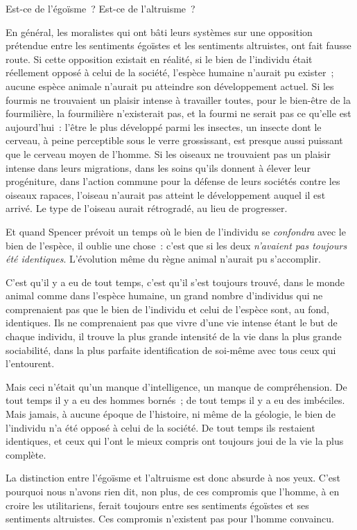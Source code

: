 \documentclass[french,twoside]{book} %
\begin{document}
Est-ce de l’égoïsme ? Est-ce de l’altruisme ?\par
\bigbreak
\noindent En général, les moralistes qui ont bâti leurs systèmes sur une opposition prétendue entre les sentiments égoïstes et les sentiments altruistes, ont fait fausse route. Si cette opposition existait en réalité, si le bien de l’individu était réellement opposé à celui de la société, l’espèce humaine n’aurait pu exister ; aucune espèce animale n’aurait pu atteindre son développement actuel. Si les fourmis ne trouvaient un plaisir intense à travailler toutes, pour le bien-être de la fourmilière, la fourmilière n’existerait pas, et la fourmi ne serait pas ce qu’elle est aujourd’hui : l’être le plus développé parmi les insectes, un insecte dont le cerveau, à peine perceptible sous le verre grossissant, est presque aussi puissant que le cerveau moyen de l’homme. Si les oiseaux ne trouvaient pas un plaisir intense dans leurs migrations, dans les soins qu’ils donnent à élever leur progéniture, dans l’action commune pour la défense de leurs sociétés contre les oiseaux rapaces, l’oiseau n’aurait pas atteint le développement auquel il est arrivé. Le type de l’oiseau aurait rétrogradé, au lieu de progresser.\par
Et quand Spencer prévoit un temps où le bien de l’individu se \emph{confondra} avec le bien de l’espèce, il oublie une chose : c’est que si les deux \emph{n’avaient pas toujours été identiques}. L’évolution même du règne animal n’aurait pu s’accomplir.\par
C’est qu’il y a eu de tout temps, c’est qu’il s’est toujours trouvé, dans le monde animal comme dans l’espèce humaine, un grand nombre d’individus qui ne comprenaient pas que le bien de l’individu et celui de l’espèce sont, au fond, identiques. Ils ne comprenaient pas que vivre d’une vie intense étant le but de chaque individu, il trouve la plus grande intensité  de la vie dans la plus grande sociabilité, dans la plus parfaite identification de soi-même avec tous ceux qui l’entourent.\par
Mais ceci n’était qu’un manque d’intelligence, un manque de compréhension. De tout temps il y a eu des hommes bornés ; de tout temps il y a eu des imbéciles. Mais jamais, à aucune époque de l’histoire, ni même de la géologie, le bien de l’individu n’a été opposé à celui de la société. De tout temps ils restaient identiques, et ceux qui l’ont le mieux compris ont toujours joui de la vie la plus complète.\par
\bigbreak
\noindent La distinction entre l’égoïsme et l’altruisme est donc absurde à nos yeux. C’est pourquoi nous n’avons rien dit, non plus, de ces compromis que l’homme, à en croire les utilitariens, ferait toujours entre ses sentiments égoïstes et ses sentiments altruistes. Ces compromis n’existent pas pour l’homme convaincu.\par
\end{document}
